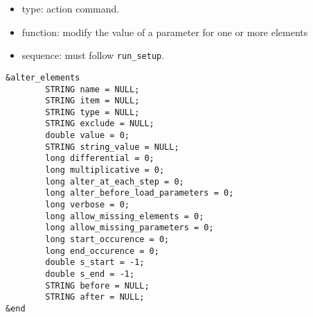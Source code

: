 \documentclass[11pt]{article}
\begin{document}
\begin{itemize}
\item type: action command.
\item function: modify the value of a parameter for one or more elements
\item sequence: must follow \verb|run_setup|.
\end{itemize}

\begin{verbatim}
&alter_elements
        STRING name = NULL;
        STRING item = NULL;
        STRING type = NULL;
        STRING exclude = NULL;
        double value = 0;
        STRING string_value = NULL;
        long differential = 0;
        long multiplicative = 0;
        long alter_at_each_step = 0;
        long alter_before_load_parameters = 0;
        long verbose = 0;
        long allow_missing_elements = 0;
        long allow_missing_parameters = 0;
        long start_occurence = 0;
        long end_occurence = 0;
        double s_start = -1;
        double s_end = -1;
        STRING before = NULL;
        STRING after = NULL;
&end
\end{verbatim}
\end{document}
